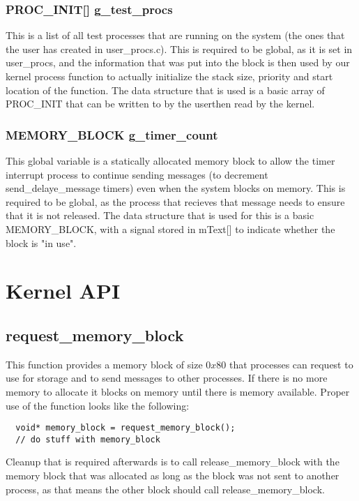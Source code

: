 \documentclass[12pt]{article}
\begin{document}
\subsubsection{PROC\_INIT[] g\_test\_procs}
  This is a list of all test processes that are running on the system (the ones that the user has created in user\_procs.c). This is required to be global, as it is set in user\_procs, and the information that was put into the block is then used by our kernel process function to actually initialize the stack size, priority and start location of the function. The data structure that is used is a basic array of PROC\_INIT that can be written to by the userthen read by the kernel.

\subsubsection{MEMORY\_BLOCK g\_timer\_count}\label{gtimercount}
  This global variable is a statically allocated memory block to allow the timer interrupt process to continue sending messages (to decrement send\_delaye\_message timers) even when the system blocks on memory. This is required to be global, as the process that recieves that message needs to ensure that it is not released. The data structure that is used for this is a basic MEMORY\_BLOCK, with a signal stored in mText[] to indicate whether the block is "in use".


\newpage
\section{Kernel API}\label{api}
\subsection{request\_memory\_block}\label{requestmemoryblockf}
  This function provides a memory block of size $0x80$ that processes can request to use for storage and to send messages to other processes. If there is no more memory to allocate it blocks on memory until there is memory available. Proper use of the function looks like the following:
  \begin{lstlisting}
  void* memory_block = request_memory_block();
  // do stuff with memory_block
  \end{lstlisting}
  Cleanup that is required afterwards is to call release\_memory\_block with the memory block that was allocated as long as the block was not sent to another process, as that means the other block should call release\_memory\_block.
\end{document}
